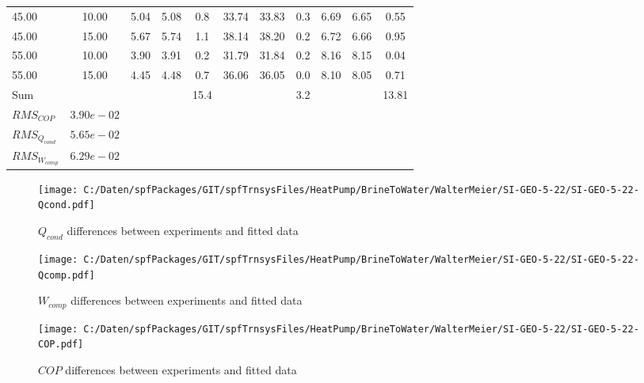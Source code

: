 \documentclass[english]{SPFShortReport}
\begin{document}
\begin{table}[!ht]
\begin{small}
\begin{center}
{\begin{tabular}{l | c c c c c c c c c c }
45.00  & 10.00 & 5.04 & 5.08 & 0.8 & 33.74 & 33.83 & 0.3 & 6.69 & 6.65 & 0.55\\ 
45.00  & 15.00 & 5.67 & 5.74 & 1.1 & 38.14 & 38.20 & 0.2 & 6.72 & 6.66 & 0.95\\ 
55.00  & 10.00 & 3.90 & 3.91 & 0.2 & 31.79 & 31.84 & 0.2 & 8.16 & 8.15 & 0.04\\ 
55.00  & 15.00 & 4.45 & 4.48 & 0.7 & 36.06 & 36.05 & 0.0 & 8.10 & 8.05 & 0.71\\ 
\hline 
 Sum &  & &  & 15.4 &  &  & 3.2 & &  & 13.81\\ 
\hline 
 $RMS_{COP}$ & $3.90e-02$ \\ 
 $RMS_{Q_{cond}}$ & $5.65e-02$ \\ 
 $RMS_{W_{comp}}$ & $6.29e-02$ \\ 
\hline
\hline
\end{tabular}
}
\label{ErrorsTable}
\end{center}
\end{small}
\end{table}
\begin{figure}[!ht]
\begin{center}
\texttt{[image: C:/Daten/spfPackages/GIT/spfTrnsysFiles/HeatPump/BrineToWater/WalterMeier/SI-GEO-5-22/SI-GEO-5-22-Qcond.pdf]}
\caption{$Q_{cond}$ differences between experiments and fitted data}
\label{QcongFig}
\end{center}
\end{figure}
\begin{figure}[!ht]
\begin{center}
\texttt{[image: C:/Daten/spfPackages/GIT/spfTrnsysFiles/HeatPump/BrineToWater/WalterMeier/SI-GEO-5-22/SI-GEO-5-22-Qcomp.pdf]}
\caption{$W_{comp}$ differences between experiments and fitted data}
\label{QcompFig}
\end{center}
\end{figure}
\begin{figure}[!ht]
\begin{center}
\texttt{[image: C:/Daten/spfPackages/GIT/spfTrnsysFiles/HeatPump/BrineToWater/WalterMeier/SI-GEO-5-22/SI-GEO-5-22-COP.pdf]}
\caption{$COP$ differences between experiments and fitted data}
\label{COPFig}
\end{center}
\end{figure}
\end{document}
